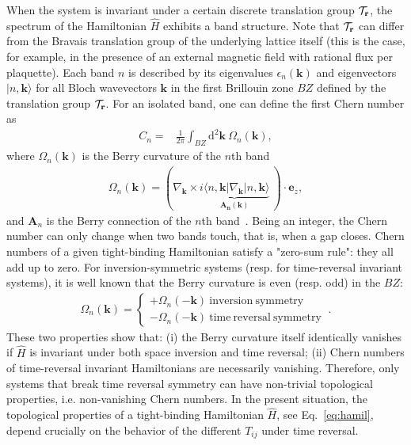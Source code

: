 \documentclass[aps,pra,showpacs,twocolumn,superscriptaddress]{revtex4-1}
\begin{document}
 
When the system is invariant under a certain discrete translation group $\mathcal{T}_{{\bf r}}$, 
the spectrum of the Hamiltonian $\hat{H}$ exhibits a band structure. Note that $\mathcal{T}_{{\bf r}}$ can differ from
the Bravais translation group of the underlying lattice itself (this is the case, 
for example, in the presence of an external magnetic field with rational flux per plaquette).
Each band $n$ is described by its eigenvalues 
$\epsilon_n(\mathbf{k})$ and eigenvectors $|n,\mathbf{k}\rangle$ for all Bloch wavevectors $\mathbf{k}$ 
in the first Brillouin zone $BZ$ defined by the translation group $\mathcal{T}_{{\bf r}}$. 
For an isolated band, one can define the first Chern number as~\cite{Niu2010, Houches2014}
\begin{align}
	C_n=&\frac{1}{2\pi}\int_{BZ}\mathrm{d}^2\mathbf{k}\ \Omega_n(\mathbf{k}),\label{eq:chern}
\end{align}
where $\Omega_n(\mathbf{k})$ is the Berry curvature of the $n$th band 
\begin{align}
	\Omega_n(\mathbf{k})=\left(\nabla_{\mathbf{k}}\times\underbrace{i\langle n,\mathbf{k}|
	\nabla_{\mathbf{k}}|n,\mathbf{k}\rangle}_{\mathbf{A_n}(\mathbf{k})}\ \right)\cdot\mathbf{e}_z,
\end{align}
and $\mathbf{A}_n$ is the Berry connection of the $n$th band~\cite{Niu2010}. 
Being an integer, the Chern number can only change when two bands touch, that is, when a gap closes.
Chern numbers of a given tight-binding Hamiltonian satisfy a "zero-sum rule": 
they all add up to zero. 
For inversion-symmetric systems (resp. for time-reversal invariant systems), 
it is well known that the Berry curvature is even (resp. odd) in the $BZ$:
\begin{align*}
		\Omega_n(\mathbf{k})=\left\lbrace\begin{matrix}
			+\Omega_n(-\mathbf{k})\ \mathrm{inversion\ symmetry}\phantom{blah}\\
			-\Omega_n(-\mathbf{k})\ \mathrm{time\ reversal\ symmetry}
		\end{matrix}\right..
\end{align*}
These two properties show that: (i) the Berry curvature itself identically vanishes if $\hat{H}$ 
is invariant under both space inversion and time reversal; (ii) Chern numbers of time-reversal invariant Hamiltonians 
are necessarily vanishing. Therefore, only systems that break time reversal symmetry can 
have non-trivial topological properties,
i.e. non-vanishing Chern numbers. In the present situation, the topological properties of a tight-binding Hamiltonian
$\hat{H}$, see Eq.~\eqref{eq:hamil}, depend 
crucially on the behavior of the different $T_{ij}$ under time reversal.
\end{document}
